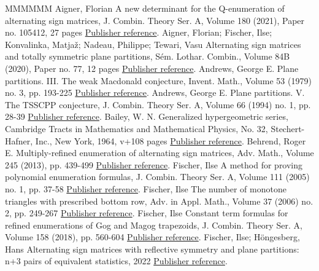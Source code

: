 \documentclass[11pt]{article}
\theoremstyle{definition}
\numberwithin{equation}{section}
\newcounter{y}
\newcounter{z}
\begin{document}
\begin{thebibliography}{MMMMMM}
 Aigner, Florian A new determinant for the Q-enumeration of alternating sign matrices, J. Combin. Theory Ser. A, Volume 180 (2021), Paper no. 105412, 27 pages \href{https://alco.centre-mersenne.org/articles/10.5802/alco.374/#Aigner21}{Publisher reference}.
 Aigner, Florian; Fischer, Ilse; Konvalinka, Matjaž; Nadeau, Philippe; Tewari, Vasu Alternating sign matrices and totally symmetric plane partitions, Sém. Lothar. Combin., Volume 84B (2020), Paper no. 77, 12 pages \href{https://alco.centre-mersenne.org/articles/10.5802/alco.374/#AignerFischerKonvalinkaNadeauTewari20}{Publisher reference}.
 Andrews, George E. Plane partitions. III. The weak Macdonald conjecture, Invent. Math., Volume 53 (1979) no. 3, pp. 193-225 \href{https://alco.centre-mersenne.org/articles/10.5802/alco.374/#Andrews79}{Publisher reference}.
 Andrews, George E. Plane partitions. V. The TSSCPP conjecture, J. Combin. Theory Ser. A, Volume 66 (1994) no. 1, pp. 28-39 \href{https://alco.centre-mersenne.org/articles/10.5802/alco.374/#Andrews94}{Publisher reference}.
 Bailey, W. N. Generalized hypergeometric series, Cambridge Tracts in Mathematics and Mathematical Physics, No. 32, Stechert-Hafner, Inc., New York, 1964, v+108 pages \href{https://alco.centre-mersenne.org/articles/10.5802/alco.374/#Bailey35}{Publisher reference}.
 Behrend, Roger E. Multiply-refined enumeration of alternating sign matrices, Adv. Math., Volume 245 (2013), pp. 439-499 \href{https://alco.centre-mersenne.org/articles/10.5802/alco.374/#Behrend13}{Publisher reference}.
 Fischer, Ilse A method for proving polynomial enumeration formulas, J. Combin. Theory Ser. A, Volume 111 (2005) no. 1, pp. 37-58 \href{https://alco.centre-mersenne.org/articles/10.5802/alco.374/#Fischer05}{Publisher reference}.
 Fischer, Ilse The number of monotone triangles with prescribed bottom row, Adv. in Appl. Math., Volume 37 (2006) no. 2, pp. 249-267 \href{https://alco.centre-mersenne.org/articles/10.5802/alco.374/#Fischer06}{Publisher reference}.
 Fischer, Ilse Constant term formulas for refined enumerations of Gog and Magog trapezoids, J. Combin. Theory Ser. A, Volume 158 (2018), pp. 560-604 \href{https://alco.centre-mersenne.org/articles/10.5802/alco.374/#Fischer18}{Publisher reference}.
 Fischer, Ilse; Höngesberg, Hans Alternating sign matrices with reflective symmetry and plane partitions: n+3 pairs of equivalent statistics, 2022 \href{https://alco.centre-mersenne.org/articles/10.5802/alco.374/#FH2022}{Publisher reference}.

\end{thebibliography}
\end{document}
